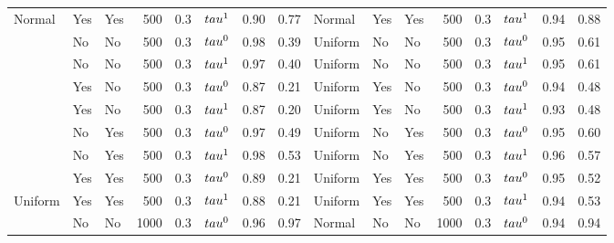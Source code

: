 \begin{tabular}[t]{lllrrlrrlllrrlrr}
\multirow{-8}{*}{\raggedright\arraybackslash Normal} & Yes & Yes & 500 & 0.3 & $\\tau^1$ & 0.90 & 0.77 & Normal & Yes & Yes & 500 & 0.3 & $\\tau^1$ & 0.94 & 0.88\\
\cmidrule{1-16}
 & No & No & 500 & 0.3 & $\\tau^0$ & 0.98 & 0.39 & Uniform & No & No & 500 & 0.3 & $\\tau^0$ & 0.95 & 0.61\\

 & No & No & 500 & 0.3 & $\\tau^1$ & 0.97 & 0.40 & Uniform & No & No & 500 & 0.3 & $\\tau^1$ & 0.95 & 0.61\\

 & Yes & No & 500 & 0.3 & $\\tau^0$ & 0.87 & 0.21 & Uniform & Yes & No & 500 & 0.3 & $\\tau^0$ & 0.94 & 0.48\\

 & Yes & No & 500 & 0.3 & $\\tau^1$ & 0.87 & 0.20 & Uniform & Yes & No & 500 & 0.3 & $\\tau^1$ & 0.93 & 0.48\\

 & No & Yes & 500 & 0.3 & $\\tau^0$ & 0.97 & 0.49 & Uniform & No & Yes & 500 & 0.3 & $\\tau^0$ & 0.95 & 0.60\\

 & No & Yes & 500 & 0.3 & $\\tau^1$ & 0.98 & 0.53 & Uniform & No & Yes & 500 & 0.3 & $\\tau^1$ & 0.96 & 0.57\\

 & Yes & Yes & 500 & 0.3 & $\\tau^0$ & 0.89 & 0.21 & Uniform & Yes & Yes & 500 & 0.3 & $\\tau^0$ & 0.95 & 0.52\\

\multirow{-8}{*}{\raggedright\arraybackslash Uniform} & Yes & Yes & 500 & 0.3 & $\\tau^1$ & 0.88 & 0.21 & Uniform & Yes & Yes & 500 & 0.3 & $\\tau^1$ & 0.94 & 0.53\\
\cmidrule{1-16}
 & No & No & 1000 & 0.3 & $\\tau^0$ & 0.96 & 0.97 & Normal & No & No & 1000 & 0.3 & $\\tau^0$ & 0.94 & 0.94\\


\end{tabular}
